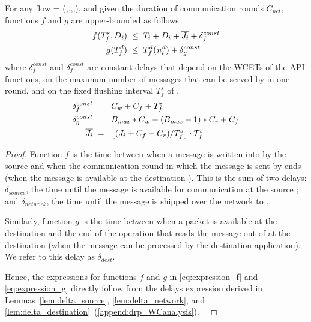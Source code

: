 \begin{theorem}
  \label{thm:delta}
  For any flow \flowi = (\flowsrci,\flowdsti,\periodi,\jitteri,\deadlinei), and given the duration of communication rounds $C_{net}$, functions $f$ and $g$ are upper-bounded as follows
  \begin{align}
  f(T_f^s ,  D_{\mathit{i}})
  	& \; \leq \;
  	T_i + D_i + \overline{J_{i}}  + \delta_f^{const} \label{eq:expression_f}\\
  g(T_f^d)
  	& \; \leq  \;
  	T_f^d(\mathit{n^d_{i}}) + \delta_g^{const} \label{eq:expression_g}
  \end{align}
  where $ \delta_f^{const}$ and $\delta_f^{const}$ are constant delays that depend on the WCETs of the \bolt API functions, on the maximum number of messages \nslotsmax that can be %
  served by \blink in one round, and on the fixed flushing interval $T_f^s$ of \CPs,
  \begin{align}
  \delta_f^{const} &\;= \;\; C_w + C_f + T_f^s \\
  \delta_g^{const} &\;= \;\;\nslotsmax*C_w - (\nslotsmax-1)* C_r + C_f\\
  \label{eq:jitter_bar}
  \overline{\jitteri}  &\;= \;\; \floor*{(\jitteri + C_f - C_r)/{T_f^s}}\cdot T_f^s
  \end{align}
\end{theorem}

\begin{proof}%
Function $f$ is the time between when a message is written into \bolt by the source \apsrc and when the communication round in which the message is sent by \blink ends (\ie when the message is available at the destination \cpdst).
This is the sum of two delays: $\delta_{source}$, the time until the message is available for communication at the source \cpsrc; and $\delta_{network}$, the time until the message is shipped over the network to \cpdst.

Similarly, function $g$ is the time between when a packet is available at the destination \cpdst and the end of the \opflush operation that reads the message out of \bolt at the destination \apdst (\ie when the message can be processed by the destination application).
We refer to this delay as $\delta_{dest}$.

Hence, the expressions for functions $f$ and $g$ in \eqref{eq:expression_f} and \eqref{eq:expression_g} directly follow from the delays expression derived in Lemmas~\ref{lem:delta_source}, \ref{lem:delta_network}, and \ref{lem:delta_destination}~(\cref{append:drp_WCanalysis}).
\
\end{proof}

